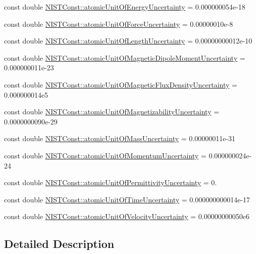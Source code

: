 \begin{DoxyCompactItemize}
const double \hyperlink{group___atomic_unit_ga9ae5ae472d1398b66893dd3c71604fcf}{N\+I\+S\+T\+Const\+::atomic\+Unit\+Of\+Energy\+Uncertainty} = 0.\+000000054e-\/18
\item 
const double \hyperlink{group___atomic_unit_ga54668463e376aa9eeba6c13441d2d208}{N\+I\+S\+T\+Const\+::atomic\+Unit\+Of\+Force\+Uncertainty} = 0.\+00000010e-\/8
\item 
const double \hyperlink{group___atomic_unit_gafc60ae3e5ac09e358e8c6fdf1358e592}{N\+I\+S\+T\+Const\+::atomic\+Unit\+Of\+Length\+Uncertainty} = 0.\+00000000012e-\/10
\item 
const double \hyperlink{group___atomic_unit_gaca6d7da7bbbf63b529e97916ce72239a}{N\+I\+S\+T\+Const\+::atomic\+Unit\+Of\+Magnetic\+Dipole\+Moment\+Uncertainty} = 0.\+000000011e-\/23
\item 
const double \hyperlink{group___atomic_unit_ga8f5dccf4f14d5b1255acd282165808c0}{N\+I\+S\+T\+Const\+::atomic\+Unit\+Of\+Magnetic\+Flux\+Density\+Uncertainty} = 0.\+000000014e5
\item 
const double \hyperlink{group___atomic_unit_ga660abcd5b236c672a4f71398bc4894b6}{N\+I\+S\+T\+Const\+::atomic\+Unit\+Of\+Magnetizability\+Uncertainty} = 0.\+0000000090e-\/29
\item 
const double \hyperlink{group___atomic_unit_gaa9459757651cf86d89e722db9911b0e1}{N\+I\+S\+T\+Const\+::atomic\+Unit\+Of\+Mass\+Uncertainty} = 0.\+00000011e-\/31
\item 
const double \hyperlink{group___atomic_unit_ga1caee1ebff58bd1dbd998d78c23f0f98}{N\+I\+S\+T\+Const\+::atomic\+Unit\+Of\+Momentum\+Uncertainty} = 0.\+000000024e-\/24
\item 
const double \hyperlink{group___atomic_unit_gaeaf886d76aaf96540bcf9f633fdefd6c}{N\+I\+S\+T\+Const\+::atomic\+Unit\+Of\+Permittivity\+Uncertainty} = 0.
\item 
const double \hyperlink{group___atomic_unit_ga18e7346fb75798ae9f339c99b3852950}{N\+I\+S\+T\+Const\+::atomic\+Unit\+Of\+Time\+Uncertainty} = 0.\+000000000014e-\/17
\item 
const double \hyperlink{group___atomic_unit_ga519034dfac791b4fd441640dd6859c2e}{N\+I\+S\+T\+Const\+::atomic\+Unit\+Of\+Velocity\+Uncertainty} = 0.\+00000000050e6
\end{DoxyCompactItemize}


\subsection{Detailed Description}


